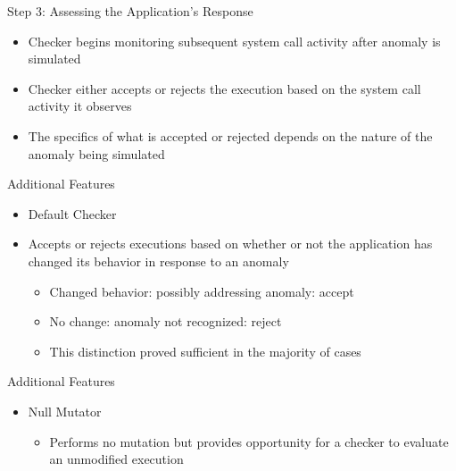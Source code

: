 \documentclass[pdf]{beamer}
\begin{document}
\begin{frame}{Step 3: Assessing the Application's Response}
  \begin{itemize}
    \item{Checker begins monitoring subsequent system call activity
      after anomaly is simulated}
    \item{Checker either accepts or rejects the execution based on the system
      call activity it observes}
    \item{The specifics of what is accepted or rejected depends on the nature
      of the anomaly being simulated}
  \end{itemize}
\end{frame}


\begin{frame}{Additional Features}
  \begin{itemize}
    \item{Default Checker}
    \item{Accepts or rejects executions based on whether or not the
      application has changed its behavior in response to an anomaly}
      \begin{itemize}
        \item{Changed behavior: possibly addressing anomaly: accept}
        \item{No change: anomaly not recognized: reject}
        \item{This distinction proved sufficient in the majority of cases}
      \end{itemize}
  \end{itemize}
\end{frame}


\begin{frame}{Additional Features}
  \begin{itemize}
    \item{Null Mutator}
      \begin{itemize}
        \item{Performs no mutation but provides opportunity for a checker to
          evaluate an unmodified execution}
      \end{itemize}
  \end{itemize}
\end{frame}
\end{document}
